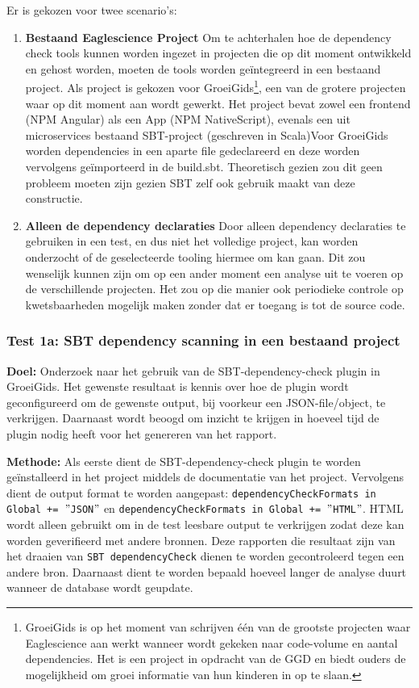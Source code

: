 Er is gekozen voor twee scenario's:
\begin{enumerate}
    \item \textbf{Bestaand Eaglescience Project} Om te achterhalen hoe de dependency check tools kunnen worden ingezet in projecten die op dit moment ontwikkeld en gehost worden, moeten de tools worden geïntegreerd in een bestaand project. Als project is gekozen voor GroeiGids\footnote{GroeiGids is op het moment van schrijven één van de grootste projecten waar Eaglescience aan werkt wanneer wordt gekeken naar code-volume en aantal dependencies. Het is een project in opdracht van de GGD en biedt ouders de mogelijkheid om groei informatie van hun kinderen in op te slaan.}, een van de grotere projecten waar op dit moment aan wordt gewerkt. Het project bevat zowel een frontend (NPM Angular) als een App (NPM NativeScript), evenals een uit microservices bestaand SBT-project (geschreven in Scala)Voor GroeiGids worden dependencies in een aparte file gedeclareerd en deze worden vervolgens geïmporteerd in de build.sbt. Theoretisch gezien zou dit geen probleem moeten zijn gezien SBT zelf ook gebruik maakt van deze constructie.

    \item \textbf{Alleen de dependency declaraties} Door alleen dependency declaraties te gebruiken in een test, en dus niet het volledige project, kan worden onderzocht of de geselecteerde tooling hiermee om kan gaan. Dit zou wenselijk kunnen zijn om op een ander moment een analyse uit te voeren op de verschillende projecten. Het zou op die manier ook periodieke controle op kwetsbaarheden mogelijk maken zonder dat er toegang is tot de source code.
\end{enumerate}

\subsubsection{Test 1a: SBT dependency scanning in een bestaand project}
\textbf{Doel:} Onderzoek naar het gebruik van de SBT-dependency-check plugin in GroeiGids. Het gewenste resultaat is kennis over hoe de plugin wordt geconfigureerd om de gewenste output, bij voorkeur een JSON-file/object, te verkrijgen. Daarnaast wordt beoogd om inzicht te krijgen in hoeveel tijd de plugin nodig heeft voor het genereren van het rapport.

\textbf{Methode:} Als eerste dient de SBT-dependency-check plugin te worden geïnstalleerd in het project middels de documentatie van het project. Vervolgens dient de output format te worden aangepast: \texttt{dependencyCheckFormats in Global += $"$JSON$"$}
en \texttt{dependencyCheckFormats in Global += $"$HTML$"$}. HTML wordt alleen gebruikt om in de test leesbare output te verkrijgen zodat deze kan worden geverifieerd met andere bronnen. Deze rapporten die resultaat zijn van het draaien van \texttt{SBT dependencyCheck} dienen te worden gecontroleerd tegen een andere bron. Daarnaast dient te worden bepaald hoeveel langer de analyse duurt wanneer de database wordt geupdate.

